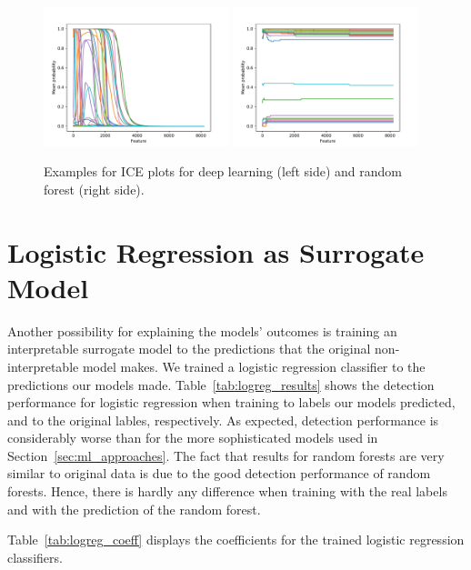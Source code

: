 \documentclass[sigconf,nonacm]{acmart}
\begin{document}
\begin{figure}[p]
\includegraphics[width=0.48\textwidth]{plots/ice/apply(stdev(ipTotalLength),forward)_nn_0.pdf}
\includegraphics[width=0.48\textwidth]{plots/ice/apply(stdev(ipTotalLength),forward)_rf_0.pdf}

\caption{Examples for ICE plots for deep learning (left side) and random forest (right side).}
\label{fig:ice}
\end{figure}

\section{Logistic Regression as Surrogate Model}
Another possibility for explaining the models' outcomes is training an interpretable surrogate model to the predictions that the original non-interpretable model makes. We trained a logistic regression classifier to the predictions our models made. Table~\ref{tab:logreg_results} shows the detection performance for logistic regression when training to labels our models predicted, and to the original lables, respectively. As expected, detection performance is considerably worse than for the more sophisticated models used in Section~\ref{sec:ml_approaches}. The fact that results for random forests are very similar to original data is due to the good detection performance of random forests. Hence, there is hardly any difference when training with the real labels and with the prediction of the random forest.

 Table~\ref{tab:logreg_coeff} displays the coefficients for the trained logistic regression classifiers.
 
\end{document}
